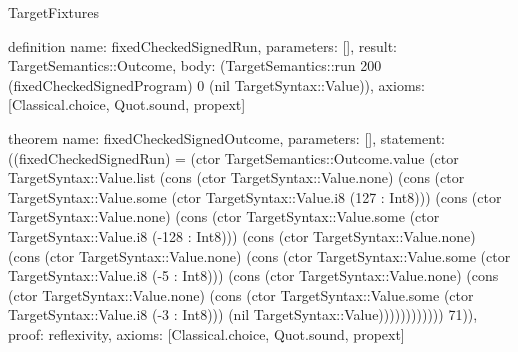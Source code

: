 \begin{lexlean}{TargetFixtures}
\begin{semanticmodule}
definition{
  name: fixedCheckedSignedRun,
  parameters: [],
  result: TargetSemantics::Outcome,
  body: (TargetSemantics::run 200 (fixedCheckedSignedProgram) 0 (nil TargetSyntax::Value)),
  axioms: [Classical.choice, Quot.sound, propext]
}

theorem{
  name: fixedCheckedSignedOutcome,
  parameters: [],
  statement: ((fixedCheckedSignedRun) = (ctor TargetSemantics::Outcome.value (ctor TargetSyntax::Value.list (cons (ctor TargetSyntax::Value.none) (cons (ctor TargetSyntax::Value.some (ctor TargetSyntax::Value.i8 (127 : Int8))) (cons (ctor TargetSyntax::Value.none) (cons (ctor TargetSyntax::Value.some (ctor TargetSyntax::Value.i8 (-128 : Int8))) (cons (ctor TargetSyntax::Value.none) (cons (ctor TargetSyntax::Value.none) (cons (ctor TargetSyntax::Value.some (ctor TargetSyntax::Value.i8 (-5 : Int8))) (cons (ctor TargetSyntax::Value.none) (cons (ctor TargetSyntax::Value.none) (cons (ctor TargetSyntax::Value.some (ctor TargetSyntax::Value.i8 (-3 : Int8))) (nil TargetSyntax::Value)))))))))))) 71)),
  proof: reflexivity{},
  axioms: [Classical.choice, Quot.sound, propext]
}


\end{semanticmodule}
\end{lexlean}
